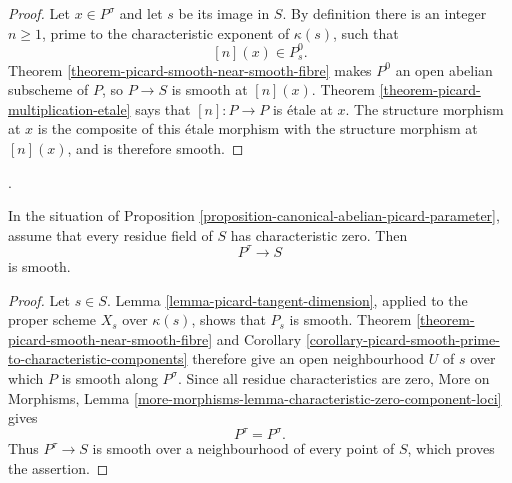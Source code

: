 \begin{proof}
Let $x \in P^\sigma$ and let $s$ be its image in $S$. By definition there is
an integer $n \geq 1$, prime to the characteristic exponent of $\kappa(s)$,
such that
$$
[n](x) \in P_s^0.
$$
Theorem \ref{theorem-picard-smooth-near-smooth-fibre} makes $P^0$ an open
abelian subscheme of $P$, so $P \to S$ is smooth at $[n](x)$. Theorem
\ref{theorem-picard-multiplication-etale} says that $[n] : P \to P$ is
\'etale at $x$. The structure morphism at $x$ is the composite of this
\'etale morphism with the structure morphism at $[n](x)$, and is therefore
smooth.
\end{proof}

\begin{lemma}
\label{corollary-picard-torsion-components-smooth-characteristic-zero}
\begin{reference}
\cite[Expos\'e 236, Corollary 3.9, p. 241]{FGA}.
\end{reference}
In the situation of Proposition
\ref{proposition-canonical-abelian-picard-parameter}, assume that every
residue field of $S$ has characteristic zero. Then
$$
P^\tau \longrightarrow S
$$
is smooth.
\end{lemma}

\begin{proof}
Let $s \in S$. Lemma \ref{lemma-picard-tangent-dimension}, applied to the
proper scheme $X_s$ over $\kappa(s)$, shows that $P_s$ is smooth. Theorem
\ref{theorem-picard-smooth-near-smooth-fibre} and Corollary
\ref{corollary-picard-smooth-prime-to-characteristic-components} therefore
give an open neighbourhood $U$ of $s$ over which $P$ is smooth along
$P^\sigma$. Since all residue characteristics are zero, More on Morphisms,
Lemma \ref{more-morphisms-lemma-characteristic-zero-component-loci} gives
$$
P^\tau=P^\sigma.
$$
Thus $P^\tau\to S$ is smooth over a neighbourhood of every point of $S$,
which proves the assertion.
\end{proof}


